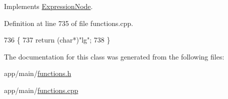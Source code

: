 Implements \hyperlink{classExpressionNode_a42a5e9562b0f645a19dcc83f698069b5}{Expression\+Node}.



Definition at line 735 of file functions.\+cpp.


\begin{DoxyCode}
736 \{
737     \textcolor{keywordflow}{return} (\textcolor{keywordtype}{char}*)\textcolor{stringliteral}{"lg"};
738 \}
\end{DoxyCode}


The documentation for this class was generated from the following files\+:\begin{DoxyCompactItemize}
\item 
app/main/\hyperlink{functions_8h}{functions.\+h}\item 
app/main/\hyperlink{functions_8cpp}{functions.\+cpp}\end{DoxyCompactItemize}
